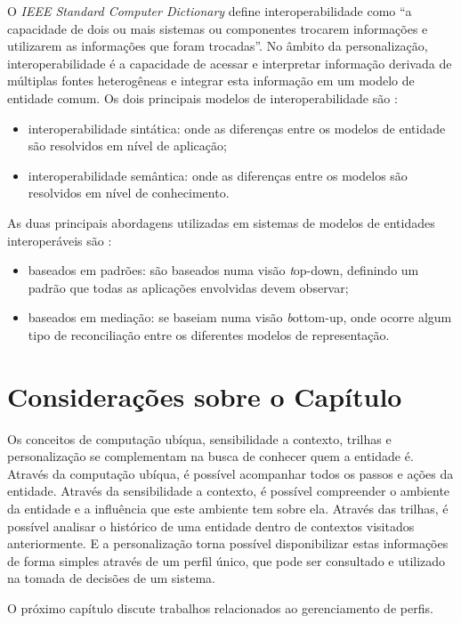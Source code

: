 O {\em IEEE Standard Computer Dictionary} \cite{ieeedict} define interoperabilidade como ``a capacidade de dois ou mais sistemas ou componentes trocarem informações e utilizarem as informações que foram trocadas''. No âmbito da personalização, interoperabilidade é a capacidade de acessar e interpretar informação derivada de múltiplas fontes heterogêneas e integrar esta informação em um modelo de entidade comum. Os dois principais modelos de interoperabilidade são \cite{carmagnola09}: 

\begin{itemize}

  \item interoperabilidade sintática: onde as diferenças entre os modelos de entidade são resolvidos em nível de aplicação;
  \item interoperabilidade semântica: onde as diferenças entre os modelos são resolvidos em nível de conhecimento.

\end{itemize}

As duas principais abordagens utilizadas em sistemas de modelos de entidades interoperáveis são \cite{viviani10}:

\begin{itemize}

  \item baseados em padrões: são baseados numa visão {\textit top-down}, definindo um padrão que todas as aplicações envolvidas devem observar;
  \item baseados em mediação: se baseiam numa visão {\textit bottom-up}, onde ocorre algum tipo de reconciliação entre os diferentes modelos de representação.

\end{itemize}


\section{Considerações sobre o Capítulo}

Os conceitos de computação ubíqua, sensibilidade a contexto, trilhas e personalização se complementam na busca de conhecer quem a entidade é. Através da computação ubíqua, é possível acompanhar todos os passos e ações da entidade. Através da sensibilidade a contexto, é possível compreender o ambiente da entidade e a influência que este ambiente tem sobre ela. Através das trilhas, é possível analisar o histórico de uma entidade dentro de contextos visitados anteriormente. E a personalização torna possível disponibilizar estas informações de forma simples através de um perfil único, que pode ser consultado e utilizado na tomada de decisões de um sistema.

O próximo capítulo discute trabalhos relacionados ao gerenciamento de perfis.
